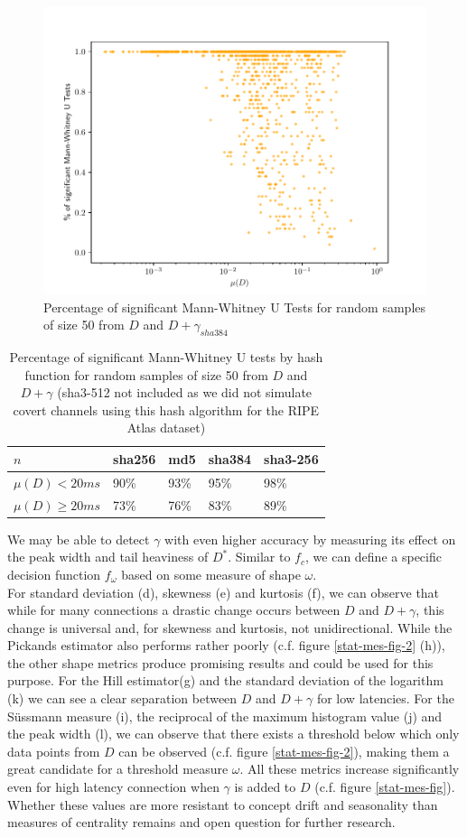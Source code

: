 \documentclass[12pt,a4paper,automark, toc=bib]{scrreprt}
\theoremstyle{definition}
\begin{document}
			\begin{figure}
				\centering
				\includegraphics[width=0.4\linewidth]{figures/mwu_p_50__sha384_0.pdf}
				\caption{Percentage of significant Mann-Whitney U Tests for random samples of size 50 from $D$ and $D+\gamma_{sha384}$}
				\label{mwu-fig}
			\end{figure}
			\begin{table}
				\centering
					\begin{tabular}{l | l | l | l | l }
						$n$ & sha256 & md5 & sha384 & sha3-256\\ %
						\hline
						$\mu(D) < 20 ms$ &  90\% & 93\% & 95\% & 98\%  \\
						$\mu(D) \geq 20 ms$ & 73\% & 76\% & 83\% & 89\%  \\
					\end{tabular}
			\caption{Percentage of significant Mann-Whitney U tests by hash function for random samples of size 50 from $D$ and $D+\gamma$ (sha3-512 not included as we did not simulate covert channels using this hash algorithm for the RIPE Atlas dataset)}
			\label{mwu-tab}
			\end{table}
			We may be able to detect $\gamma$ with even higher accuracy by measuring its effect on the peak width and tail heaviness of $D^*$. Similar to $f_c$, we can define a specific decision function $f_\omega$ based on some measure of shape $\omega$.
			\pagebreak\\ 
			For standard deviation (d), skewness (e) and kurtosis (f), we can observe that while for many connections a drastic change occurs between $D$ and $D + \gamma$, this change is universal and, for skewness and kurtosis, not unidirectional. While the Pickands estimator also performs rather poorly (c.f. figure \ref{stat-mes-fig-2} (h)), the other shape metrics produce promising results and could be used for this purpose. For the Hill estimator(g) and the standard deviation of the logarithm (k) we can see a clear separation between $D$ and $D + \gamma$ for low latencies. For the Süssmann measure (i), the reciprocal of the maximum histogram value (j) and the peak width (l), we can observe that there exists a threshold below which only data points from $D$ can be observed (c.f. figure \ref{stat-mes-fig-2}), making them a great candidate for a threshold measure $\omega$. All these metrics increase significantly even for high latency connection when $\gamma$ is added to $D$ (c.f. figure \ref{stat-mes-fig}). Whether these values are more resistant to concept drift and seasonality than measures of centrality remains and open question for further research.\\
\end{document}
